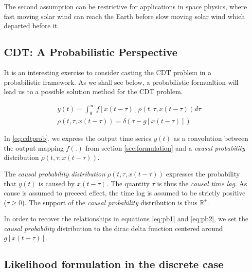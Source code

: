 \documentclass[envcountsect,runningheads]{llncs}
\theoremstyle{etoile}
\begin{document}
The second assumption can be restrictive for applications in space physics, where fast moving 
solar wind can reach the Earth before slow moving solar wind which departed before it. 

\subsection{CDT: A Probabilistic Perspective}\label{sec:cdtprobform}

It is an interesting exercise to consider casting the CDT problem in a probabilistic framework.
As we shall see below, a probabilistic formualtion will lead us to a possible solution method
for the CDT problem. 

\begin{align} \label{eq:cdtprob}
      &y(t) = \int_{0}^{\infty}{f[x(t - \tau)] \rho(t, \tau, x(t - \tau))}d \tau \\
      & \nonumber \rho(t, \tau, x(t - \tau))  = \delta(\tau - g[x(t - \tau)])
\end{align}

In \ref{eq:cdtprob}, we express the output time series $y(t)$ as a convolution between
the output mapping $f(.)$ from section \ref{sec:formulation} and a \emph{causal probability}
distribution $\rho(t, \tau, x(t - \tau))$. 

The \emph{causal probability distribution} $\rho(t, \tau, x(t - \tau))$ expresses the probability 
that $y(t)$ is caused by $x(t - \tau)$. The quantity $\tau$ is thus the \emph{causal time lag}. 
As cause is assumed to preceed effect, the time lag is assumed to be strictly positive ($\tau \geq 0$). 
The support of the \emph{causal probability} distribution is thus $\mathbb{R}^+$.

In order to recover the relationships in equations \ref{eq:pb1} and \ref{eq:pb2}, we 
set the \emph{causal probability} distribution to the dirac delta function centered
around $g[x(t - \tau)]$.


\subsection{Likelihood formulation in the discrete case}
\end{document}
